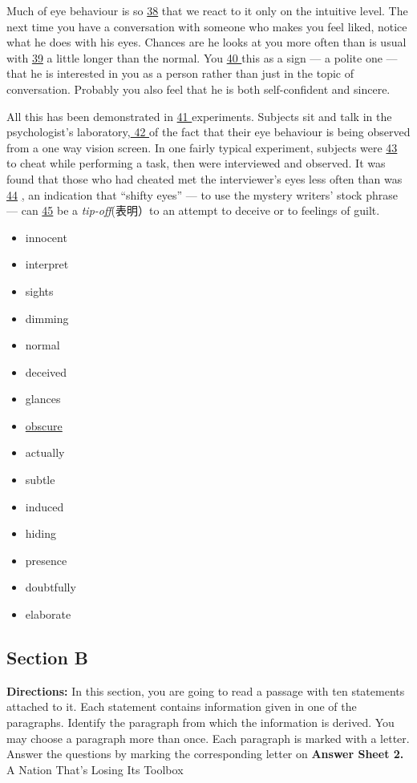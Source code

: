\documentclass[UTF8,11pt]{ctexart}
\begin{document}
Much of eye behaviour is so \uline{38} that we react to it only on the intuitive level. The next time you have a conversation with someone who makes you feel liked, notice what he does with his eyes. Chances are he looks at you more often than is usual with \uline{39} a little longer than the normal. You \uline{40 }this as a sign — a polite one — that he is interested in you as a person rather than just in the topic of conversation. Probably you also feel that he is both self-confident and sincere.


All this has been demonstrated in \uline{41 }experiments. Subjects sit and talk in the psychologist’s laboratory,\uline{ 42 }of the fact that their eye behaviour is being observed from a one way vision screen. In one fairly typical experiment, subjects were \uline{43 }to cheat while performing a task, then were interviewed and observed. It was found that those who had cheated met the interviewer’s eyes less often than was \uline{44} \uline{,} an indication that “shifty eyes” — to use the mystery writers’ stock phrase — can \uline{45} be a\textit{ tip-off}(表明）to an attempt to deceive or to feelings of guilt.


\begin{itemize}[leftmargin=2em,itemsep=.2em,topsep=.4em]\item[A.] innocent
\item[B.] interpret
\item[C.] sights
\item[D.] dimming
\item[E.] normal
\item[F.] deceived
\item[G.] glances
\item[H.] \uline{obscure}
\item[I.] actually
\item[J.] subtle
\item[K.] induced
\item[L.] hiding
\item[M.] presence
\item[N.] doubtfully
\item[O.] elaborate
\end{itemize}

\subsection*{\textbf{Section B}}


\textbf{Directions:} In this section, you are going to read a passage with ten statements attached to it. Each statement contains information given in one of the paragraphs. Identify the paragraph from which the information is derived. You may choose a paragraph more than once. Each paragraph is marked with a letter. Answer the questions by marking the corresponding letter on\textbf{ Answer Sheet 2.} A Nation That’s Losing Its Toolbox
\end{document}
